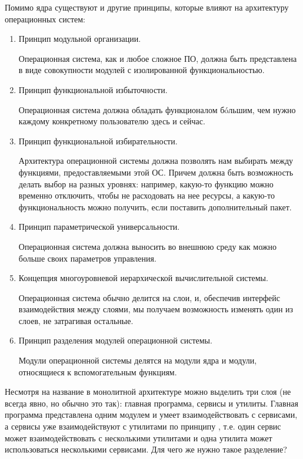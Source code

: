 Помимо ядра существуют и другие принципы, которые влияют на архитектуру
операционных систем:

\begin{enumerate}
\item
  Принцип модульной организации.

  Операционная система, как и любое сложное ПО, должна быть представлена в виде
  совокупности модулей с изолированной функциональностью.

\item
  Принцип функциональной избыточности.

  Операционная система должна обладать функционалом б\'oльшим, чем нужно каждому
  конкретному пользователю здесь и сейчас.

\item
  Принцип функциональной избирательности.

  Архитектура операционной системы должна позволять нам выбирать между
  функциями, предоставляемыми этой ОС. Причем должна быть возможность делать
  выбор на разных уровнях: например, какую-то функцию можно временно отключить,
  чтобы не расходовать на нее ресурсы, а какую-то функциональность можно
  получить, если поставить дополнительный пакет.

\item
  Принцип параметрической универсальности.

  Операционная система должна выносить во внешнюю среду как можно больше своих
  параметров управления.

\item
  Концепция многоуровневой иерархической вычислительной системы.

  Операционная система обычно делится на слои, и, обеспечив интерфейс
  взаимодействия между слоями, мы получаем возможность изменять один из слоев,
  не затрагивая остальные.

\item
  Принцип разделения модулей операционной системы.

  Модули операционной системы делятся на модули ядра и модули, относящиеся к
  вспомогательным функциям.
\end{enumerate}



Несмотря на название в монолитной архитектуре можно выделить три слоя (не всегда
явно, но обычно это так): главная программа, сервисы и утилиты. Главная
программа представлена одним модулем и умеет взаимодействовать с сервисами, а
сервисы уже взаимодействуют с утилитами по принципу ,
т.е. один сервис может взаимодействовать с несколькими утилитами и одна утилита
может использоваться несколькими сервисами. Для чего же нужно такое разделение?

